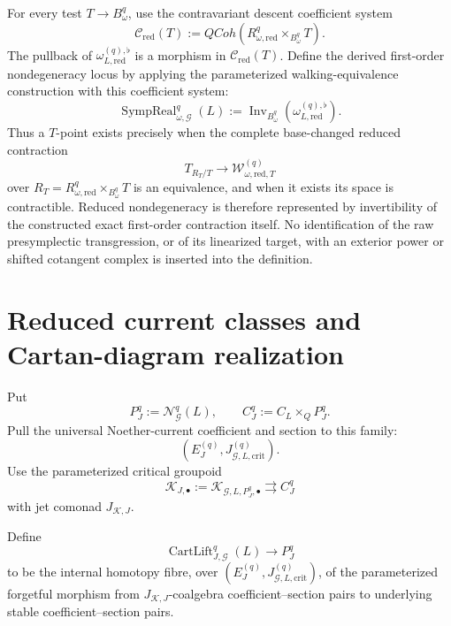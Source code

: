 \begin{definition}
\label{def:symmetry-noether-reduced-nondegeneracy-locus}
For every test $T\to B_\omega^q$, use the contravariant descent coefficient system
\[
\mathcal C_{\mathrm{red}}(T)
:=
QCoh\!\left(
R_{\omega,\mathrm{red}}^{q}
\times_{B_\omega^q}T
\right).
\]
The pullback of $\omega_{L,\mathrm{red}}^{(q),\flat}$ is a morphism in
$\mathcal C_{\mathrm{red}}(T)$.  Define the derived first-order nondegeneracy locus
by applying the parameterized walking-equivalence construction with this coefficient
system:
\[
\boxed{
\operatorname{SympReal}_{\omega,\mathcal G}^{q}(L)
:=
\operatorname{Inv}_{B_\omega^q}
\left(
\omega_{L,\mathrm{red}}^{(q),\flat}
\right).
}
\]
Thus a $T$-point exists precisely when the complete base-changed reduced
contraction
\[
T_{R_T/T}
\longrightarrow
\mathcal W_{\omega,\mathrm{red},T}^{(q)}
\]
over
$R_T=
R_{\omega,\mathrm{red}}^{q}\times_{B_\omega^q}T$
is an equivalence, and when it exists its space is contractible.  Reduced
nondegeneracy is therefore represented by invertibility of the constructed exact
first-order contraction itself.  No identification of the raw presymplectic
transgression, or of its linearized target, with an exterior power or shifted
cotangent complex is inserted into the definition.
\end{definition}

\section{Reduced current classes and Cartan-diagram realization}
\label{sec:symmetry-noether-reduced-current-classes-and-cartan-morphism-realization}

Put
\[
P_J^q:=\mathcal N_{\mathcal G}^{q}(L),
\qquad
C_J^q:=C_L\times_QP_J^q.
\]
Pull the universal Noether-current coefficient and section to this family:
\[
(E_J^{(q)},J_{\mathcal G,L,\mathrm{crit}}^{(q)}).
\]
Use the parameterized critical groupoid
\[
\mathcal K_{J,\bullet}
:=
\mathcal K_{\mathcal G,L,P_J^q,\bullet}
\rightrightarrows C_J^q
\]
with jet comonad $J_{\mathcal K,J}$.

\begin{construction}
\label{constr:symmetry-noether-internal-current-cartan-lift-object}
Define
\[
\boxed{
\operatorname{CartLift}_{J,\mathcal G}^{q}(L)
\longrightarrow
P_J^q
}
\]
to be the internal homotopy fibre, over
$(E_J^{(q)},J_{\mathcal G,L,\mathrm{crit}}^{(q)})$, of the parameterized
forgetful morphism from
$J_{\mathcal K,J}$-coalgebra coefficient--section pairs to underlying stable
coefficient--section pairs.
\end{construction}

